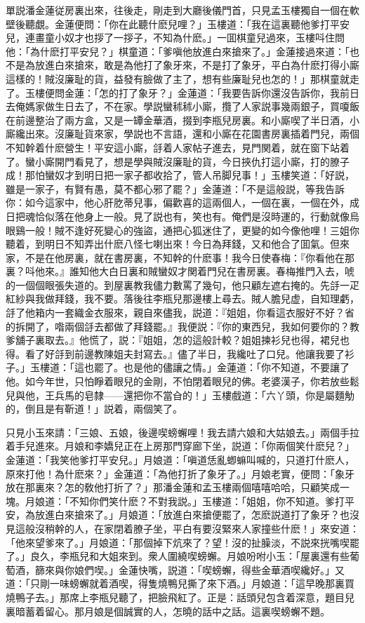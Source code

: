 單説潘金蓮従房裏出來，往後走，剛走到大廳後儀門首，只見孟玉樓獨自一個在軟壁後聽覷。金蓮便問：「你在此聽什麽兒哩？」玉樓道：「我在這裏聽他爹打平安兒，連畫童小奴才也拶了一拶子，不知為什麽。」一囬棋童兒過來，玉樓呌住問他：「為什麽打平安兒？」棋童道：「爹嗔他放進白來搶來了。」金蓮接過來道：「也不是為放進白來搶來，敢是為他打了象牙來，不是打了象牙，平白為什麽打得小廝這樣的！賊沒廉耻的貨，益發有臉做了主了，想有些廉耻兒也怎的！」那棋童就走了。玉樓便問金蓮：「怎的打了象牙？」金蓮道：「我要告訴你還沒告訴你，我前日去俺媽家做生日去了，不在家。學説蠻秫秫小廝，攬了人家説事幾兩銀子，買嗄飯在前邊整治了兩方盒，又是一罈金華酒，掇到李瓶兒房裏。和小廝喫了半日酒，小廝纔出來。沒廉耻貨來家，學説也不言語，還和小廝在花園書房裏插着門兒，兩個不知幹着什麽營生！平安這小廝，㧱着人家帖子進去，見門関着，就在窗下站着了。蠻小廝開門看見了，想是學與賊沒廉耻的貨，今日挾仇打這小廝，打的膫子成！那怕蠻奴才到明日把一家子都收拾了，管人吊脚兒事！」玉樓笑道：「好説，雖是一家子，有賢有愚，莫不都心邪了罷？」金蓮道：「不是這般説，等我告訴你：如今這家中，他心肝肐蒂兒事，偏歡喜的這兩個人，一個在裏，一個在外，成日把魂恰似落在他身上一般。見了説也有，笑也有。俺們是沒時運的，行動就像烏眼鷄一般！賊不逢好死變心的強盜，通把心狐迷住了，更變的如今像他哩！三姐你聽着，到明日不知弄出什麽八怪七喇出來！今日為拜錢，又和他合了囬氣。但來家，不是在他房裏，就在書房裏，不知幹的什麽事！我今日使春梅：『你看他在那裏？呌他來。』誰知他大白日裏和賊蠻奴才関着門兒在書房裏。春梅推門入去，唬的一個個眼張失道的。到屋裏教我儘力數罵了幾句，他只顧左遮右掩的。先㧱一疋紅紗與我做拜錢，我不要。落後往李瓶兒那邊樓上尋去。賊人膽兒虚，自知理虧，㧱了他箱内一套織金衣服來，親自來儘我，説道：『姐姐，你看這衣服好不好？省的拆開了，喒兩個㧱去都做了拜錢罷。』我便説：『你的東西兒，我如何要你的？教爹舖子裏取去。』他慌了，説：『姐姐，怎的這般計較？姐姐揀衫兒也得，裙兒也得。看了好㧱到前邊教陳姐夫封寫去。』儘了半日，我纔吐了口兒。他讓我要了衫子。」玉樓道：「這也罷了。也是他的儘讓之情。」金蓮道：「你不知道，不要讓了他。如今年世，只怕睜着眼兒的金剛，不怕閉着眼兒的佛。老婆漢子，你若放些鬆兒與他，王兵馬的皂隸——還把你不當㒲的！」玉樓戲道：「六丫頭，你是屬麵觔的，倒且是有靳道！」説着，兩個笑了。

只見小玉來請：「三娘、五娘，後邊喫螃蠏哩！我去請六娘和大姑娘去。」兩個手拉着手兒進來。月娘和李嬌兒正在上房那門穿廊下坐，説道：「你兩個笑什麽兒？」金蓮道：「我笑他爹打平安兒。」月娘道：「嗔道恁亂蝍䗫叫喊的，只道打什麽人，原來打他！為什麽來？」金蓮道：「為他打折了象牙了。」月娘老實，便問：「象牙放在那裏來？怎的敎他打折了？」那潘金蓮和孟玉樓兩個嘻嘻哈哈，只顧笑成一塊。月娘道：「不知你們笑什麽？不對我説。」玉樓道：「姐姐，你不知道。爹打平安，為放進白來搶來了。」月娘道：「放進白來搶便罷了，怎麽説道打了象牙？也沒見這般沒稍幹的人，在家閉着膫子坐，平白有要沒緊來人家撞些什麽！」來安道：「他來望爹來了。」月娘道：「那個掉下炕來了？望！沒的扯臊淡，不説來挄嘴喫罷了。」良久，李瓶兒和大姐來到。衆人圍繞喫螃蠏。月娘吩咐小玉：「屋裏還有些葡萄酒，篩來與你娘們喫。」金蓮快嘴，説道：「喫螃蠏，得些金華酒喫纔好。」又道：「只剛一味螃蠏就着酒喫，得隻燒鴨兒撕了來下酒。」月娘道：「這早晚那裏買燒鴨子去。」那席上李瓶兒聽了，把臉飛紅了。正是：話頭兒包含着深意，題目兒裏暗蓄着留心。那月娘是個誠實的人，怎曉的話中之話。這裏喫螃蠏不題。

